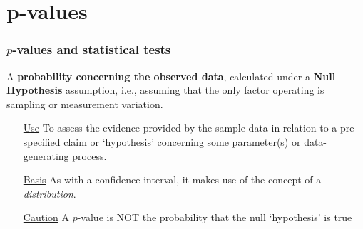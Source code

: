 \documentclass[10pt,handout]{beamer}\usepackage[]{graphicx}\usepackage[]{color}
\begin{document}
\section{p-values}

\begin{frame}
	\frametitle{$p$-values and statistical tests}
	
	
	\begin{definition}[$p$-value]
		A \textbf{probability concerning the observed data}, calculated under a \textbf{Null Hypothesis} assumption, i.e., assuming that the only factor operating is sampling or measurement variation. 
	\end{definition}
	
	\begin{itemize} 
		\item[\underline{Use}] To assess the evidence provided by the sample data
		in relation to a pre-specified claim or `hypothesis' concerning some parameter(s) or data-generating process. 
		\item[\underline{Basis}] As with a confidence interval, it makes use of the concept of a \textit{distribution}. 
		\item[\underline{Caution}] A $p$-value is NOT the probability that the null `hypothesis' is true
	\end{itemize}
\end{frame}
\end{document}

